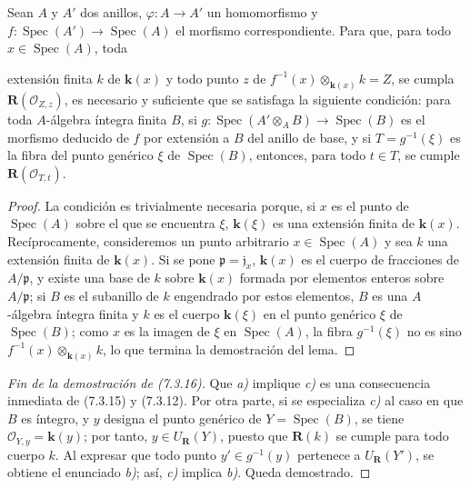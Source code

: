 \begin{lemma}[7.3.16.2]
\label{IV.2.s7.3.16.2-fr}
Sean $A$ y $A'$ dos anillos, $\varphi:A\to A'$ un homomorfismo y
$f:\operatorname{Spec}(A')\to\operatorname{Spec}(A)$ el morfismo
correspondiente. Para que, para todo $x\in\operatorname{Spec}(A)$,
toda


extensión finita $k$ de $\boldsymbol{k}(x)$ y todo punto $z$ de
$f^{-1}(x)\otimes_{\mathbf{k}(x)}k=Z$, se cumpla
$\boldsymbol R(\mathscr O_{Z,z})$, es necesario y suficiente que se
satisfaga la siguiente condición: para toda $A$-álgebra íntegra
finita $B$, si
$g:\operatorname{Spec}(A'\otimes_A B)\to\operatorname{Spec}(B)$ es
el morfismo deducido de $f$ por extensión a $B$ del anillo de base,
y si $T=g^{-1}(\xi)$ es la fibra del punto genérico $\xi$ de
$\operatorname{Spec}(B)$, entonces, para todo $t\in T$, se cumple
$\boldsymbol R(\mathscr O_{T,t})$.
\end{lemma}

\begin{proof}
La condición es trivialmente necesaria porque, si $x$ es el punto de
$\operatorname{Spec}(A)$ sobre el que se encuentra $\xi$, $\boldsymbol{k}(\xi)$
es una extensión finita de $\boldsymbol{k}(x)$. Recíprocamente, consideremos un
punto arbitrario $x\in\operatorname{Spec}(A)$ y sea $k$ una extensión
finita de $\boldsymbol{k}(x)$. Si se pone $\mathfrak p=\mathfrak j_x$, $\boldsymbol{k}(x)$ es
el cuerpo de fracciones de $A/\mathfrak p$, y existe una base de $k$
sobre $\boldsymbol{k}(x)$ formada por elementos enteros sobre $A/\mathfrak p$;
si $B$ es el subanillo de $k$ engendrado por estos elementos, $B$ es
una $A$-álgebra íntegra finita y $k$ es el cuerpo $\boldsymbol{k}(\xi)$ en el
punto genérico $\xi$ de $\operatorname{Spec}(B)$; como $x$ es la
imagen de $\xi$ en $\operatorname{Spec}(A)$, la fibra
$g^{-1}(\xi)$ no es sino $f^{-1}(x)\otimes_{\mathbf{k}(x)}k$, lo que termina
la demostración del lema.
\end{proof}

\begin{proof}[Fin de la demostración de (7.3.16)]
Que \emph{a)} implique \emph{c)} es una consecuencia inmediata de (7.3.15) y
(7.3.12). Por otra parte, si se especializa \emph{c)} al caso en que $B$
es íntegro, y $y$ designa el punto genérico de
$Y=\operatorname{Spec}(B)$, se tiene $\mathscr O_{Y,y}=\boldsymbol{k}(y)$; por
tanto, $y\in U_{\mathbf{R}}(Y)$, puesto que $\boldsymbol R(k)$
se cumple para todo cuerpo $k$. Al expresar que todo punto
$y'\in g^{-1}(y)$ pertenece a $U_{\mathbf{R}}(Y')$, se obtiene el enunciado \emph{b)}; así, \emph{c)} implica \emph{b)}. Queda demostrado.
\end{proof}
